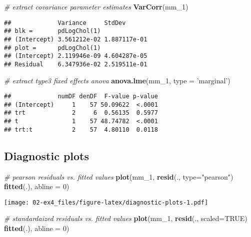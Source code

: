 \documentclass[]{book}
\newenvironment{Shaded}{\begin{snugshade}}{\end{snugshade}}
\newcommand{\CommentTok}[1]{\textcolor[rgb]{0.56,0.35,0.01}{\textit{#1}}}
\newcommand{\DataTypeTok}[1]{\textcolor[rgb]{0.13,0.29,0.53}{#1}}
\newcommand{\DecValTok}[1]{\textcolor[rgb]{0.00,0.00,0.81}{#1}}
\newcommand{\KeywordTok}[1]{\textcolor[rgb]{0.13,0.29,0.53}{\textbf{#1}}}
\newcommand{\NormalTok}[1]{#1}
\newcommand{\OperatorTok}[1]{\textcolor[rgb]{0.81,0.36,0.00}{\textbf{#1}}}
\newcommand{\OtherTok}[1]{\textcolor[rgb]{0.56,0.35,0.01}{#1}}
\newcommand{\StringTok}[1]{\textcolor[rgb]{0.31,0.60,0.02}{#1}}
\begin{document}
\begin{Shaded}
\begin{Highlighting}[]
\CommentTok{# extract covariance parameter estimates}
\KeywordTok{VarCorr}\NormalTok{(mm_}\DecValTok{1}\NormalTok{)}
\end{Highlighting}
\end{Shaded}

\begin{verbatim}
##             Variance     StdDev      
## blk =       pdLogChol(1)             
## (Intercept) 3.561212e-02 1.887117e-01
## plot =      pdLogChol(1)             
## (Intercept) 2.119946e-09 4.604287e-05
## Residual    6.347936e-02 2.519511e-01
\end{verbatim}

\begin{Shaded}
\begin{Highlighting}[]
\CommentTok{# extract type3 fixed effects anova}
\KeywordTok{anova.lme}\NormalTok{(mm_}\DecValTok{1}\NormalTok{, }\DataTypeTok{type =} \StringTok{'marginal'}\NormalTok{)}
\end{Highlighting}
\end{Shaded}

\begin{verbatim}
##             numDF denDF  F-value p-value
## (Intercept)     1    57 50.09622  <.0001
## trt             2     6  0.56135  0.5977
## t               1    57 48.74782  <.0001
## trt:t           2    57  4.80110  0.0118
\end{verbatim}

\hypertarget{diagnostic-plots}{%
\subsection{Diagnostic plots}\label{diagnostic-plots}}

\begin{Shaded}
\begin{Highlighting}[]
\CommentTok{# pearson residuals vs. fitted values}
\KeywordTok{plot}\NormalTok{(mm_}\DecValTok{1}\NormalTok{, }\KeywordTok{resid}\NormalTok{(., }\DataTypeTok{type=}\StringTok{"pearson"}\NormalTok{) }\OperatorTok{~}\StringTok{ }\KeywordTok{fitted}\NormalTok{(.), }\DataTypeTok{abline =} \DecValTok{0}\NormalTok{)}
\end{Highlighting}
\end{Shaded}

\texttt{[image: 02-ex4\_files/figure-latex/diagnostic-plots-1.pdf]}

\begin{Shaded}
\begin{Highlighting}[]
\CommentTok{# standardaized residuals vs. fitted values}
\KeywordTok{plot}\NormalTok{(mm_}\DecValTok{1}\NormalTok{, }\KeywordTok{resid}\NormalTok{(., }\DataTypeTok{scaled=}\OtherTok{TRUE}\NormalTok{) }\OperatorTok{~}\StringTok{ }\KeywordTok{fitted}\NormalTok{(.), }\DataTypeTok{abline =} \DecValTok{0}\NormalTok{)}
\end{Highlighting}
\end{Shaded}
\end{document}
